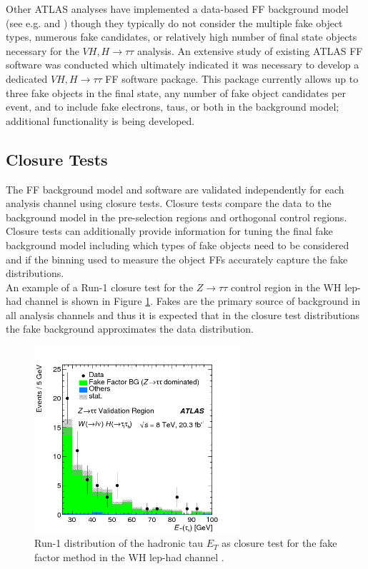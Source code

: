 Other ATLAS analyses have implemented a data-based FF background model (see e.g. \cite{fake_tau_paper} and \cite{run2_htautau}) though they typically do not consider the multiple fake object types, numerous fake candidates, or relatively high number of final state objects necessary for the $VH,H\rightarrow\tau\tau$ analysis. An extensive study of existing ATLAS FF software was conducted which ultimately indicated it was necessary to develop a dedicated $VH,H\rightarrow\tau\tau$ FF software package. This package currently allows up to three fake objects in the final state, any number of fake object candidates per event, and to include fake electrons, taus, or both in the background model; additional functionality is being developed.

\subsection{Closure Tests}\label{sec:closure}
The FF background model and software are validated independently for each analysis channel using closure tests. Closure tests compare the data to the background model in the pre-selection regions and orthogonal control regions. Closure tests can additionally provide information for tuning the final fake background model including which types of fake objects need to be considered and if the binning used to measure the object FFs accurately capture the fake distributions.\\

An example of a Run-1 closure test for the $Z\rightarrow\tau\tau$ control region in the WH lep-had channel is shown in Figure \ref{fig:run1_ff_cr}. Fakes are the primary source of background in all analysis channels and thus it is expected that in the closure test distributions the fake background approximates the data distribution.\\  

\begin{figure}[htb!]
    \centering
    \includegraphics[width=3in]{figures/chapter7/run1_ff_cr.png}
    \caption{Run-1 distribution of the hadronic tau $E_T$ as closure test for the fake factor method in the WH lep-had channel \cite{vh_run1_paper}.}
    \label{fig:run1_ff_cr}
\end{figure}

